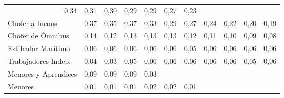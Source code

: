 \begin{tabular}{lllllllllll}
  \multicolumn{1}{r}{0,34} &
  \multicolumn{1}{r}{0,31} &
  \multicolumn{1}{r}{0,30} &
  \multicolumn{1}{r}{0,29} &
  \multicolumn{1}{r}{0,29} &
  \multicolumn{1}{r}{0,27} &
  \multicolumn{1}{r}{0,23} \\
\multicolumn{1}{l}{\hspace{1em}Chofer a Incons.} &
  \multicolumn{1}{|r}{0,37} &
  \multicolumn{1}{r}{0,35} &
  \multicolumn{1}{r}{0,37} &
  \multicolumn{1}{r}{0,33} &
  \multicolumn{1}{r}{0,29} &
  \multicolumn{1}{r}{0,27} &
  \multicolumn{1}{r}{0,24} &
  \multicolumn{1}{r}{0,22} &
  \multicolumn{1}{r}{0,20} &
  \multicolumn{1}{r}{0,19} \\
\multicolumn{1}{l}{\hspace{1em}Chofer de Ómnibus} &
  \multicolumn{1}{|r}{0,14} &
  \multicolumn{1}{r}{0,12} &
  \multicolumn{1}{r}{0,13} &
  \multicolumn{1}{r}{0,13} &
  \multicolumn{1}{r}{0,13} &
  \multicolumn{1}{r}{0,12} &
  \multicolumn{1}{r}{0,11} &
  \multicolumn{1}{r}{0,10} &
  \multicolumn{1}{r}{0,09} &
  \multicolumn{1}{r}{0,08} \\
\multicolumn{1}{l}{\hspace{1em}Estibador Marítimo} &
  \multicolumn{1}{|r}{0,06} &
  \multicolumn{1}{r}{0,06} &
  \multicolumn{1}{r}{0,06} &
  \multicolumn{1}{r}{0,06} &
  \multicolumn{1}{r}{0,06} &
  \multicolumn{1}{r}{0,05} &
  \multicolumn{1}{r}{0,06} &
  \multicolumn{1}{r}{0,06} &
  \multicolumn{1}{r}{0,06} &
  \multicolumn{1}{r}{0,06} \\
\multicolumn{1}{l}{\hspace{1em}Trabajadores Indep.} &
  \multicolumn{1}{|r}{0,04} &
  \multicolumn{1}{r}{0,03} &
  \multicolumn{1}{r}{0,05} &
  \multicolumn{1}{r}{0,06} &
  \multicolumn{1}{r}{0,06} &
  \multicolumn{1}{r}{0,06} &
  \multicolumn{1}{r}{0,06} &
  \multicolumn{1}{r}{0,06} &
  \multicolumn{1}{r}{0,05} &
  \multicolumn{1}{r}{0,06} \\
\multicolumn{1}{l}{\hspace{1em}Menores y Aprendices} &
  \multicolumn{1}{|r}{0,09} &
  \multicolumn{1}{r}{0,09} &
  \multicolumn{1}{r}{0,09} &
  \multicolumn{1}{r}{0,03} &
  \multicolumn{1}{r}{} &
  \multicolumn{1}{r}{} &
  \multicolumn{1}{r}{} &
  \multicolumn{1}{r}{} &
  \multicolumn{1}{r}{} &
  \multicolumn{1}{r}{} \\
\multicolumn{1}{l}{\hspace{1em}Menores} &
  \multicolumn{1}{|r}{0,01} &
  \multicolumn{1}{r}{0,01} &
  \multicolumn{1}{r}{0,01} &
  \multicolumn{1}{r}{0,02} &
  \multicolumn{1}{r}{0,02} &
  \multicolumn{1}{r}{0,01} &

\end{tabular}
